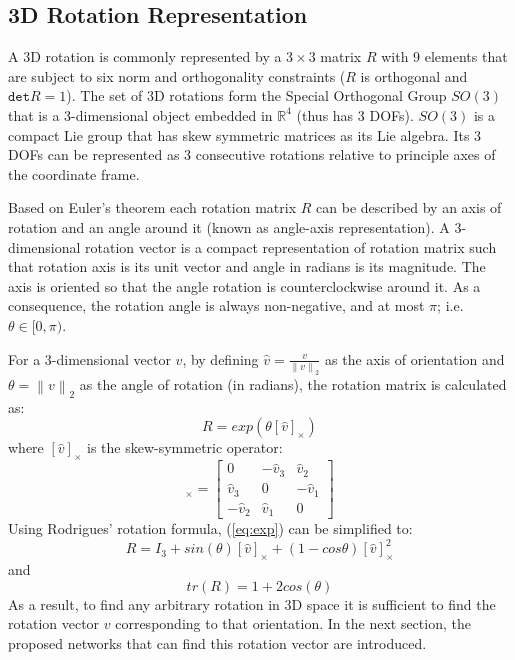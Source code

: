 \documentclass[journal,transmag]{IEEEtran}
\begin{document}
\subsection{3D Rotation Representation}
\label{sec:Representation}
A 3D rotation is commonly represented by a $3 \times 3$ matrix $R$ with 9 elements that are subject to six norm and orthogonality constraints ($R$ is orthogonal and $\texttt{det}R=1$). The set of 3D rotations form the Special Orthogonal Group $SO(3)$ that is a 3-dimensional object embedded in $\mathbb{R}^4$ (thus has 3 DOFs). $SO(3)$ is a compact Lie group that has skew symmetric matrices as its Lie algebra. Its 3 DOFs can be represented as 3 consecutive rotations relative to principle axes of the coordinate frame.%

Based on Euler's theorem each rotation matrix $R$ can be described by an axis of rotation and an angle around it (known as angle-axis representation). A 3-dimensional rotation vector is a compact representation of rotation matrix such that rotation axis is its unit vector and angle in radians is its magnitude. The axis is oriented so that the angle rotation is counterclockwise around it. As a consequence, the rotation angle is always non-negative, and at most $\pi$; i.e. $\theta\in[0,\pi)$.

For a 3-dimensional vector $v$, by defining $\hat{v} = \frac{v}{\left \| v \right \|_2}$ as the axis of orientation and $\theta = {\left \| v \right \|_2}$ as the angle of rotation (in radians), the rotation matrix is calculated as:
\begin{equation}
    R = exp(\theta[\hat{v}]_\times)
    \label{eq:exp}
\end{equation}
where $[{\hat{v}}]_\times$ is the skew-symmetric operator:
\begin{equation}[{\hat{v}}]_\times = \begin{bmatrix}
0 & -\hat{v}_3 & \hat{v}_2 \\ 
\hat{v}_3 & 0 &-\hat{v}_1 \\ 
 -\hat{v}_2& \hat{v}_1 & 0
\end{bmatrix}
\label{skew}
\end{equation}
\noindent Using Rodrigues' rotation formula, (\ref{eq:exp}) can be simplified to:
\begin{equation}
    R = I_3 + sin(\theta)[\hat{v}]_\times + (1-cos\theta)[\hat{v}]_\times^2
    \label{rod}
\end{equation}
\noindent and
\begin{equation}
    tr(R) = 1 + 2cos(\theta)
    \label{trace}
\end{equation}
\noindent As a result, to find any arbitrary rotation in 3D space it is sufficient to find the rotation vector $v$ corresponding to that orientation. In the next section, the proposed networks that can find this rotation vector are introduced. 
\end{document}
